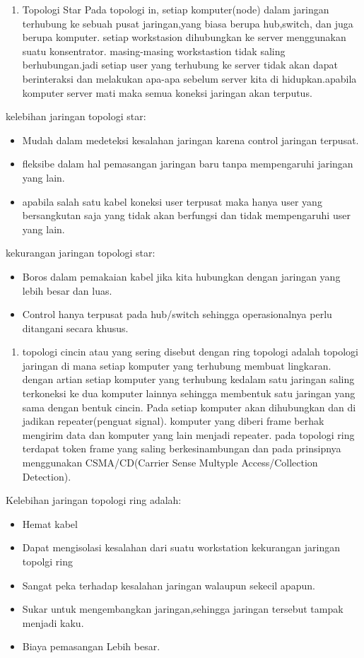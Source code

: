 \begin{enumerate}
  \item Topologi Star
        Pada topologi in, setiap komputer(node) dalam jaringan terhubung ke sebuah pusat jaringan,yang biasa berupa hub,switch, dan juga berupa komputer. setiap workstasion dihubungkan ke server menggunakan suatu konsentrator. masing-masing workstastion tidak saling berhubungan.jadi setiap user yang terhubung ke server tidak akan dapat berinteraksi dan melakukan apa-apa sebelum server kita di hidupkan.apabila komputer server mati maka semua koneksi jaringan akan terputus.
\end{enumerate}
kelebihan jaringan topologi star:
\begin{itemize}
  \item Mudah dalam medeteksi kesalahan jaringan karena control jaringan terpusat.
  \item fleksibe dalam hal pemasangan jaringan baru tanpa mempengaruhi jaringan yang lain.
  \item apabila salah satu kabel koneksi user terpusat maka hanya user yang bersangkutan saja yang tidak akan berfungsi dan tidak mempengaruhi user yang lain.
\end{itemize}
kekurangan jaringan topologi star:
\begin{itemize}
  \item Boros dalam pemakaian kabel jika kita hubungkan dengan jaringan yang lebih besar dan luas.
  \item Control hanya terpusat pada hub/switch sehingga operasionalnya perlu ditangani secara khusus.
\end{itemize}

\begin{enumerate}
  \item topologi cincin atau yang sering disebut dengan ring topologi adalah topologi jaringan di mana setiap komputer yang terhubung membuat lingkaran. dengan artian setiap komputer yang terhubung kedalam satu jaringan saling terkoneksi ke dua komputer lainnya sehingga membentuk satu jaringan yang sama dengan bentuk cincin.
      Pada setiap komputer akan dihubungkan dan di jadikan repeater(penguat signal). komputer yang diberi frame berhak mengirim data dan komputer yang lain menjadi repeater. pada topologi ring terdapat token frame yang saling berkesinambungan dan pada prinsipnya menggunakan CSMA/CD(Carrier Sense Multyple Access/Collection Detection).
\end{enumerate}
Kelebihan jaringan topologi ring adalah:
\begin{itemize}
  \item Hemat kabel
  \item Dapat mengisolasi kesalahan dari suatu workstation kekurangan jaringan topolgi ring
  \item Sangat peka terhadap kesalahan jaringan walaupun sekecil apapun.
  \item Sukar untuk mengembangkan jaringan,sehingga jaringan tersebut tampak menjadi kaku.
  \item Biaya pemasangan Lebih besar.
\end{itemize}

